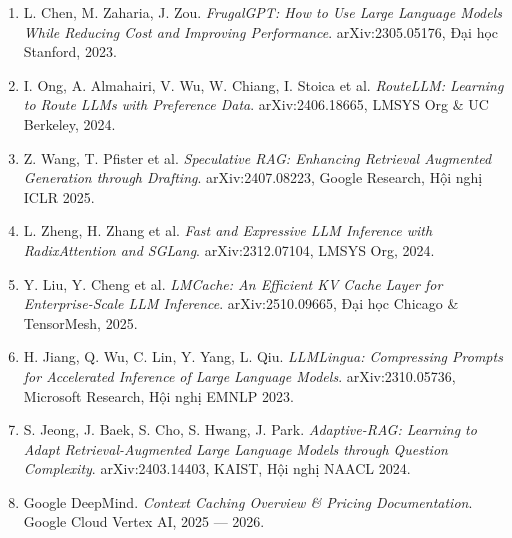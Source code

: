 \documentclass[12pt,a4paper]{article}
\begin{document}
\begin{enumerate}[leftmargin=1.5em]
    \item L. Chen, M. Zaharia, J. Zou. \textit{FrugalGPT: How to Use Large Language Models While Reducing Cost and Improving Performance}. arXiv:2305.05176, Đại học Stanford, 2023.
    \item I. Ong, A. Almahairi, V. Wu, W. Chiang, I. Stoica et al. \textit{RouteLLM: Learning to Route LLMs with Preference Data}. arXiv:2406.18665, LMSYS Org \& UC Berkeley, 2024.
    \item Z. Wang, T. Pfister et al. \textit{Speculative RAG: Enhancing Retrieval Augmented Generation through Drafting}. arXiv:2407.08223, Google Research, Hội nghị ICLR 2025.
    \item L. Zheng, H. Zhang et al. \textit{Fast and Expressive LLM Inference with RadixAttention and SGLang}. arXiv:2312.07104, LMSYS Org, 2024.
    \item Y. Liu, Y. Cheng et al. \textit{LMCache: An Efficient KV Cache Layer for Enterprise-Scale LLM Inference}. arXiv:2510.09665, Đại học Chicago \& TensorMesh, 2025.
    \item H. Jiang, Q. Wu, C. Lin, Y. Yang, L. Qiu. \textit{LLMLingua: Compressing Prompts for Accelerated Inference of Large Language Models}. arXiv:2310.05736, Microsoft Research, Hội nghị EMNLP 2023.
    \item S. Jeong, J. Baek, S. Cho, S. Hwang, J. Park. \textit{Adaptive-RAG: Learning to Adapt Retrieval-Augmented Large Language Models through Question Complexity}. arXiv:2403.14403, KAIST, Hội nghị NAACL 2024.
    \item Google DeepMind. \textit{Context Caching Overview \& Pricing Documentation}. Google Cloud Vertex AI, 2025 --- 2026.
\end{enumerate}
\end{document}
